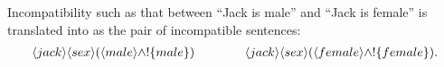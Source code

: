 
Incompatibility such as that between ``Jack is male'' and ``Jack is
female'' is translated into \cathoristic{} as the pair of incompatible
sentences:
\begin{eqnarray*}
\langle jack \rangle \langle sex \rangle (\langle male \rangle \land ! \{male\}) 
   \qquad\qquad
\langle jack \rangle \langle sex \rangle (\langle female \rangle \land ! \{female\}).
\end{eqnarray*}

